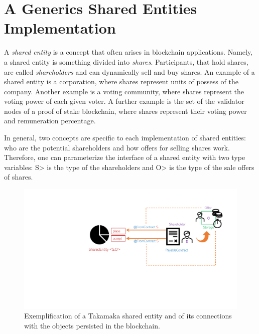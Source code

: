 \section{A Generics Shared Entities Implementation}\label{sec:shared_entities}

A \emph{shared entity} is a concept that often arises in blockchain
applications. Namely, a shared entity is something divided into \emph{shares}. Participants,
that hold shares, are called \emph{shareholders} and can dynamically
sell and buy shares. An example of a shared entity is a corporation,
where shares represent units of possess of the company. Another example is
a voting community, where shares represent the voting power of each given voter.
A further example is the set of the validator nodes of a proof of stake blockchain,
where shares represent their voting power and remuneration percentage.

In general, two concepts are specific to each implementation of shared entities:
who are the potential shareholders and how offers for selling shares work.
Therefore, one can parameterize the interface of a shared entity with two type variables:
\<S> is the type of the shareholders and \<O> is the type of the sale offers of shares.

\begin{figure}[ht]
\centering
\includegraphics[width=\linewidth]{figures/shared_entity}
\caption{Exemplification of a Takamaka shared entity and of its connections with the objects persisted in the blockchain.}
\label{figure.shared_entity}
\end{figure}


